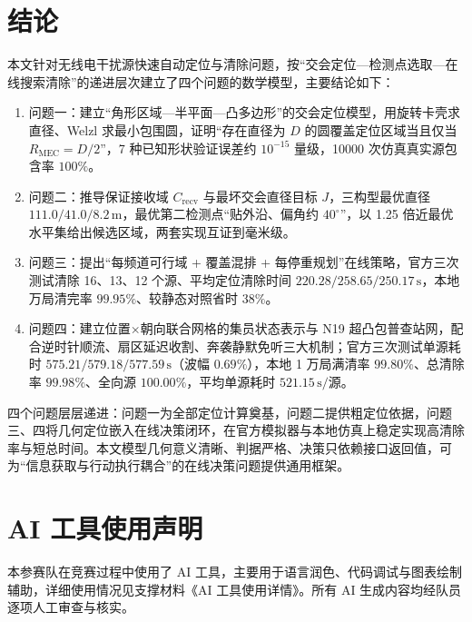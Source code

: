 \documentclass[12pt,a4paper]{article}
\newcommand{\Rmec}{R_{\mathrm{MEC}}}
\newcommand{\Crecv}{C_{\mathrm{recv}}}
\begin{document}
\section{结论}
本文针对无线电干扰源快速自动定位与清除问题，按“交会定位---检测点选取---在线搜索清除”的递进层次建立了四个问题的数学模型，主要结论如下：
\begin{enumerate}
\item 问题一：建立“角形区域---半平面---凸多边形”的交会定位模型，用旋转卡壳求直径、Welzl 求最小包围圆，证明“存在直径为 $D$ 的圆覆盖定位区域当且仅当 $\Rmec=D/2$”，7 种已知形状验证误差约 $10^{-15}$ 量级，10000 次仿真真实源包含率 $100\%$。
\item 问题二：推导保证接收域 $\Crecv$ 与最坏交会直径目标 $J$，三构型最优直径 $111.0/41.0/8.2\,\mathrm{m}$，最优第二检测点“贴外沿、偏角约 $40^{\circ}$”，以 1.25 倍近最优水平集给出候选区域，两套实现互证到毫米级。
\item 问题三：提出“每频道可行域 + 覆盖混排 + 每停重规划”在线策略，官方三次测试清除 16、13、12 个源、平均定位清除时间 $220.28/258.65/250.17\,\mathrm{s}$，本地万局清完率 $99.95\%$、较静态对照省时 $38\%$。
\item 问题四：建立位置$\times$朝向联合网格的集员状态表示与 N19 超凸包普查站网，配合逆时针顺流、扇区延迟收割、奔袭静默免听三大机制；官方三次测试单源耗时 $575.21/579.18/577.59\,\mathrm{s}$（波幅 $0.69\%$），本地 1 万局满清率 $99.80\%$、总清除率 $99.98\%$、全向源 $100.00\%$，平均单源耗时 $521.15\,\mathrm{s}/$源。
\end{enumerate}
四个问题层层递进：问题一为全部定位计算奠基，问题二提供粗定位依据，问题三、四将几何定位嵌入在线决策闭环，在官方模拟器与本地仿真上稳定实现高清除率与短总时间。本文模型几何意义清晰、判据严格、决策只依赖接口返回值，可为“信息获取与行动执行耦合”的在线决策问题提供通用框架。

\section*{AI 工具使用声明}
本参赛队在竞赛过程中使用了 AI 工具，主要用于语言润色、代码调试与图表绘制辅助，详细使用情况见支撑材料《AI 工具使用详情》。所有 AI 生成内容均经队员逐项人工审查与核实。

\clearpage
\end{document}
